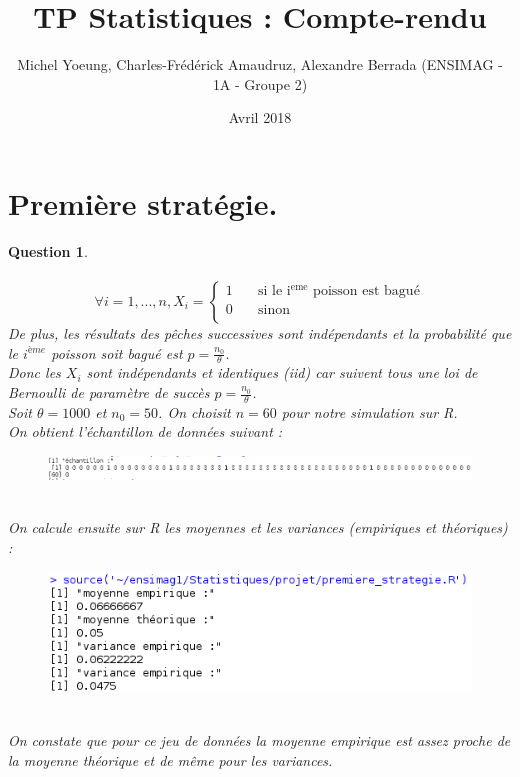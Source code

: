 \documentclass[a4paper,11pt]{article}
\title{TP Statistiques : Compte-rendu}
\author{Michel Yoeung, Charles-Frédérick Amaudruz, Alexandre Berrada (ENSIMAG - 1A - Groupe 2)}
\date{Avril 2018}
\newtheorem{exo1}{Question}
\begin{document}
\maketitle

\section{Première stratégie.}

\begin{exo1} \ \\ \\
\[
  \forall i = 1,...,n, X_{i} = \left\{
                                  \begin{array}{ll}
                                    1 & \quad \mathrm{\text{si le $i^{eme}$ poisson est bagué}} \\
                                    0 & \quad \mathrm{sinon} \\
                                  \end{array}
                                \right.
\]
De plus, les résultats des pêches successives sont indépendants et la probabilité que le $i^{ème}$ poisson soit bagué est $p=\frac{n_{0}}{\theta}$. \ \\
Donc les $X_{i}$ sont indépendants et identiques (iid) car suivent tous une loi de Bernoulli de paramètre de succès $p=\frac{n_{0}}{\theta}$. \ \\
Soit $\theta=1000$ et $n_{0}=50$. On choisit $n=60$ pour notre simulation sur R. \ \\
On obtient l'échantillon de données suivant :
\begin{figure}[h]
\includegraphics[scale=0.45]{images/Q1_1_donnees.png}
\end{figure} \ \\
On calcule ensuite sur R les moyennes et les variances (empiriques et théoriques) :
\begin{figure}[h]
\includegraphics[scale=0.7]{images/Q1_1.png}
\end{figure} \ \\
On constate que pour ce jeu de données la moyenne empirique est assez proche de la moyenne théorique et de même pour les variances.
\end{exo1}
\end{document}
